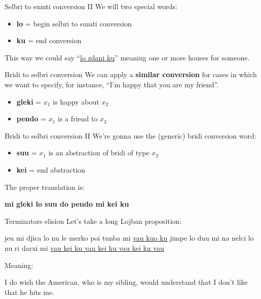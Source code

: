 \begin{frame}{Selbri to sumti conversion II}
    We will two special words:
    \begin{itemize}
        \item \textbf{lo} = begin selbri to sumti conversion
        \item \textbf{ku} = end conversion
    \end{itemize}

    This way we could say ``\underline{lo zdani ku}'' meaning one or more houses for someone.
\end{frame}

\begin{frame}{Bridi to selbri conversion}
    We can apply a \textbf{similar conversion} for cases in which we want to specify, for instance, ``I'm happy that you are my friend''.

    \begin{itemize}
        \item \textbf{gleki} = $x_1$ is happy about $x_2$
        \item \textbf{pendo} = $x_1$ is a friend to $x_2$
    \end{itemize}
\end{frame}

\begin{frame}{Bridi to selbri conversion II}
    We're gonna use the (generic) bridi conversion word:

    \begin{itemize}
        \item \textbf{su\textquotesingle u} = $x_1$ is an abstraction of bridi of type $x_2$
        \item \textbf{kei} = end abstraction
    \end{itemize}

    \pause
    The proper translation is:
    \begin{center}
        \textbf{mi gleki lo su\textquotesingle u do pendo mi kei ku}
    \end{center}
\end{frame}

\begin{frame}{Terminators elision}
    Let's take a long Lojban proposition:

    \begin{center}
        je\textquotesingle u mi djica lo nu le merko poi tunba mi \underline{vau ku\textquotesingle o ku} jimpe lo du\textquotesingle u mi na nelci lo nu ri darxi mi \underline{vau kei ku vau kei ku vau kei ku vau}
    \end{center}

    Meaning:
    \begin{center}
        I do wish the American, who is my sibling, would understand that I don't like that he hits me.
    \end{center}
\end{frame}


